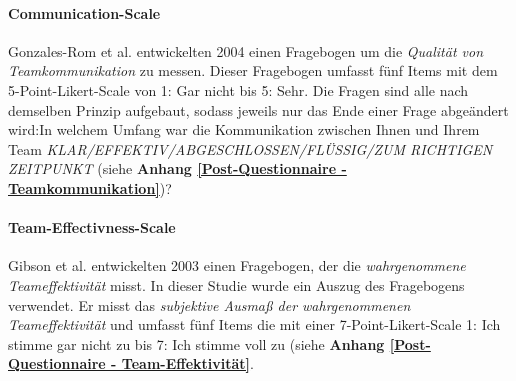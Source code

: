 \documentclass[a4paper,11pt]{article}%
\renewcommand{\\}{\vspace*{0.5\baselineskip} \newline}
\begin{document}
		\paragraph{Communication-Scale}
Gonzales-Rom et al. \citep[S.1049]{gonzalez2014climate} entwickelten 2004 einen Fragebogen um die  \textit{Qualität von Teamkommunikation} zu messen. Dieser Fragebogen umfasst fünf Items mit dem 5-Point-Likert-Scale von 1: \glqq{}Gar nicht\dq{} bis 5: \glqq{}Sehr\dq{}. Die Fragen sind alle nach demselben Prinzip aufgebaut, sodass jeweils nur das Ende einer Frage abgeändert wird:\glqq{}In welchem Umfang war die Kommunikation zwischen Ihnen und Ihrem Team \textit{KLAR/EFFEKTIV/ABGESCHLOSSEN/FLÜSSIG/ZUM RICHTIGEN ZEITPUNKT\dq{}} (siehe \textbf{Anhang \ref{Post-Questionnaire - Teamkommunikation}})?

		\paragraph{Team-Effectivness-Scale}
Gibson et al. \citep[S.469]{gibson2003team} entwickelten 2003 einen Fragebogen, der die \textit{wahrgenommene Teameffektivität} misst. In dieser Studie wurde ein Auszug des Fragebogens verwendet. Er misst das \textit{subjektive Ausmaß der wahrgenommenen Teameffektivität} und umfasst fünf Items die mit einer 7-Point-Likert-Scale 1: \glqq{}Ich stimme gar nicht zu\dq{} bis 7: \glqq{}Ich stimme voll zu\dq{} (siehe \textbf{Anhang \ref{Post-Questionnaire - Team-Effektivität}}.

\end{document}

